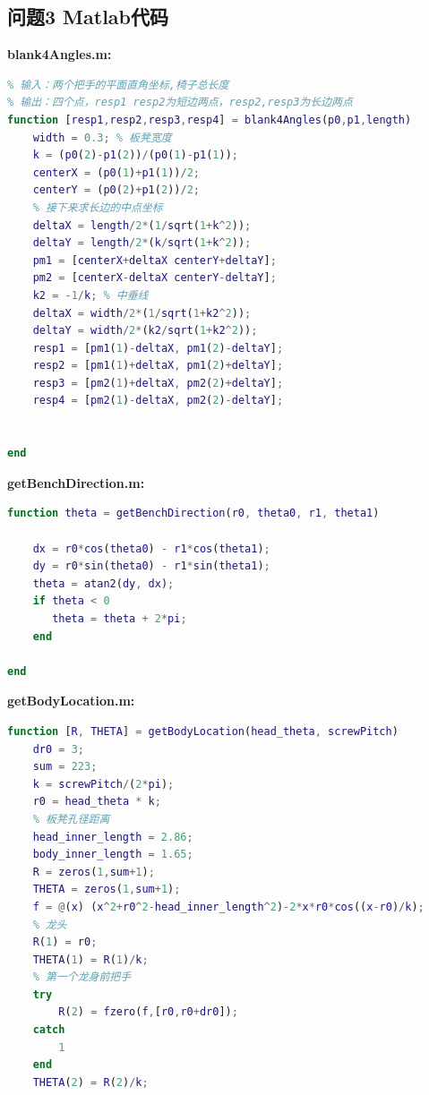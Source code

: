 \documentclass[withoutpreface,bwprint]{cumcmthesis} %
\begin{document}
\begin{appendices}
\section{问题3 Matlab代码}
\noindent\textbf{\textcolor[rgb]{0.98,0.00,0.00}{blank4Angles.m:}}
\begin{lstlisting}[language=matlab]
% 根据两个把手的坐标（xy），获得四个角上点的坐标（xy）
% 输入：两个把手的平面直角坐标,椅子总长度
% 输出：四个点，resp1 resp2为短边两点，resp2,resp3为长边两点
function [resp1,resp2,resp3,resp4] = blank4Angles(p0,p1,length)
    width = 0.3; % 板凳宽度
    k = (p0(2)-p1(2))/(p0(1)-p1(1));
    centerX = (p0(1)+p1(1))/2;
    centerY = (p0(2)+p1(2))/2;
    % 接下来求长边的中点坐标
    deltaX = length/2*(1/sqrt(1+k^2));
    deltaY = length/2*(k/sqrt(1+k^2));
    pm1 = [centerX+deltaX centerY+deltaY];
    pm2 = [centerX-deltaX centerY-deltaY];
    k2 = -1/k; % 中垂线
    deltaX = width/2*(1/sqrt(1+k2^2));
    deltaY = width/2*(k2/sqrt(1+k2^2));
    resp1 = [pm1(1)-deltaX, pm1(2)-deltaY];
    resp2 = [pm1(1)+deltaX, pm1(2)+deltaY];
    resp3 = [pm2(1)+deltaX, pm2(2)+deltaY];
    resp4 = [pm2(1)-deltaX, pm2(2)-deltaY];
    
    
end
\end{lstlisting}
\noindent\textbf{\textcolor[rgb]{0.98,0.00,0.00}{getBenchDirection.m:}}
\begin{lstlisting}[language=matlab]
% 输入两个点的极坐标，输出两个点向量与x轴正方向的夹角，即板凳方向
function theta = getBenchDirection(r0, theta0, r1, theta1)

    dx = r0*cos(theta0) - r1*cos(theta1);
    dy = r0*sin(theta0) - r1*sin(theta1);
    theta = atan2(dy, dx);
    if theta < 0
       theta = theta + 2*pi; 
    end

end
\end{lstlisting}
\newpage
\noindent\textbf{\textcolor[rgb]{0.98,0.00,0.00}{getBodyLocation.m:}}
\begin{lstlisting}[language=matlab]
% 输入龙头相角，输出整条龙包括龙头、龙身、龙尾的位置（极坐标）
function [R, THETA] = getBodyLocation(head_theta, screwPitch)
    dr0 = 3;
    sum = 223;
    k = screwPitch/(2*pi);
    r0 = head_theta * k;
    % 板凳孔径距离
    head_inner_length = 2.86;
    body_inner_length = 1.65;
    R = zeros(1,sum+1);
    THETA = zeros(1,sum+1);
    f = @(x) (x^2+r0^2-head_inner_length^2)-2*x*r0*cos((x-r0)/k);
    % 龙头
    R(1) = r0;
    THETA(1) = R(1)/k;
    % 第一个龙身前把手
    try
        R(2) = fzero(f,[r0,r0+dr0]);
    catch
        1
    end
    THETA(2) = R(2)/k;
    

\end{lstlisting}
\end{appendices}
\end{document}
